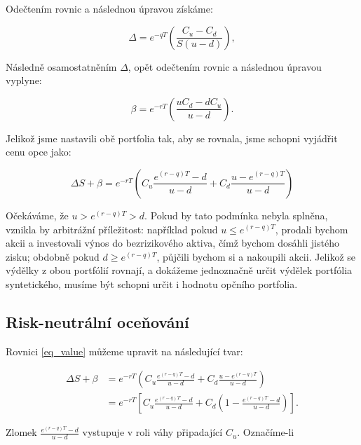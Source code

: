 \documentclass{article}
\begin{document}
Odečtením rovnic a následnou úpravou získáme: 

\begin{equation}
  \Delta = e^{-qT} \left( \frac{C_u - C_d}{S(u - d)} \right),
\end{equation}

Následně osamostatněním $\Delta$, opět odečtením rovnic a následnou úpravou vyplyne:

\begin{equation}
  \beta = e^{-rT} \left( \frac{u C_d - d C_u}{u - d} \right).
\end{equation}

Jelikož jsme nastavili obě portfolia tak, aby se rovnala, jsme schopni vyjádřit cenu opce jako:

\begin{equation}
  \label{eq_value}
  \Delta S + \beta = e^{-rT} \left( C_u \frac{e^{(r - q) T} -d}{u - d} + C_d \frac{u - e^{(r - q) T}}{u - d} \right)
\end{equation}

\citep{CoxRossRubinstein1979} \citep[Kapitola~13]{McDonald2013}

Očekáváme, že $u > e^{(r - q) T} > d$. Pokud by tato podmínka nebyla splněna, vznikla by arbitrážní příležitost: například pokud $u \le e^{(r-q)T}$, prodali bychom akcii a investovali výnos do bezrizikového aktiva, čímž bychom dosáhli jistého zisku; obdobně pokud $d \ge e^{(r-q)T}$, půjčili bychom si a nakoupili akcii. %
Jelikož se výdělky z obou portfólií rovnají, a dokážeme jednoznačně určit výdělek portfólia syntetického, musíme být schopni určit i hodnotu opčního portfolia.

\subsection{Risk-neutrální oceňování}

Rovnici \ref{eq_value} můžeme upravit na následující tvar:

\begin{align}
  \Delta S + \beta &= e^{-rT} \left( C_u \frac{e^{(r - q) T} -d}{u - d} + C_d \frac{u - e^{(r - q) T}}{u - d} \right) \\
                   &= e^{-rT} \left[ C_u \frac{e^{(r - q) T} -d}{u - d} + C_d \left( 1 - \frac{e^{(r - q) T} -d}{u - d} \right) \right].
\end{align}

Zlomek $\frac{e^{(r - q) T} - d}{u - d}$ vystupuje v roli váhy připadající $C_u$. Označíme-li
\end{document}
